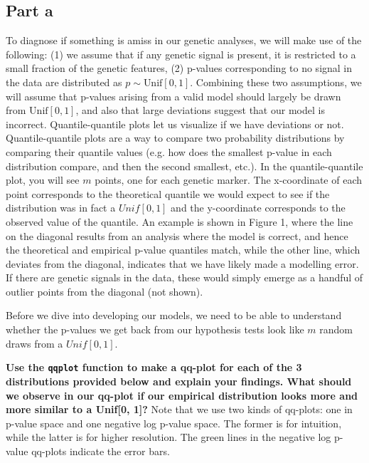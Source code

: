 \documentclass[11pt]{article}
\begin{document}
    \subsection{Part a}\label{part-a}

To diagnose if something is amiss in our genetic analyses, we will make
use of the following: (1) we assume that if any genetic signal is
present, it is restricted to a small fraction of the genetic features,
(2) p-values corresponding to no signal in the data are distributed as
\(p \sim \text{Unif}[0,1]\). Combining these two assumptions, we will
assume that p-values arising from a valid model should largely be drawn
from \(\text{Unif}[0,1]\), and also that large deviations suggest that
our model is incorrect. Quantile-quantile plots let us visualize if we
have deviations or not. Quantile-quantile plots are a way to compare two
probability distributions by comparing their quantile values (e.g. how
does the smallest p-value in each distribution compare, and then the
second smallest, etc.). In the quantile-quantile plot, you will see
\(m\) points, one for each genetic marker. The x-coordinate of each
point corresponds to the theoretical quantile we would expect to see if
the distribution was in fact a \(Unif[0, 1]\) and the y-coordinate
corresponds to the observed value of the quantile. An example is shown
in Figure 1, where the line on the diagonal results from an analysis
where the model is correct, and hence the theoretical and empirical
p-value quantiles match, while the other line, which deviates from the
diagonal, indicates that we have likely made a modelling error. If there
are genetic signals in the data, these would simply emerge as a handful
of outlier points from the diagonal (not shown).

Before we dive into developing our models, we need to be able to
understand whether the p-values we get back from our hypothesis tests
look like \(m\) random draws from a \(Unif[0, 1]\).

\textbf{Use the \texttt{qqplot} function to make a qq-plot for each of
the 3 distributions provided below and explain your findings. What
should we observe in our qq-plot if our empirical distribution looks
more and more similar to a Unif{[}0, 1{]}?} Note that we use two kinds
of qq-plots: one in p-value space and one negative log p-value space.
The former is for intuition, while the latter is for higher resolution.
The green lines in the negative log p-value qq-plots indicate the error
bars.
\end{document}
